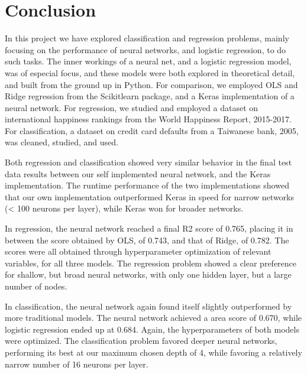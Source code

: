 \documentclass[10pt, twocolumn]{article}
\begin{document}
\section{Conclusion}
In this project we have explored classification and regression problems, mainly focusing on the performance of neural networks, and logistic regression, to do such tasks. The inner workings of a neural net, and a logistic regression model, was of especial focus, and these models were both explored in theoretical detail, and built from the ground up in Python. For comparison, we employed OLS and Ridge regression from the Scikitlearn package, and a Keras implementation of a neural network. For regression, we studied and employed a dataset on international happiness rankings from the World Happiness Report, 2015-2017. For classification, a dataset on credit card defaults from a Taiwanese bank, 2005, was cleaned, studied, and used.

Both regression and classification showed very similar behavior in the final test data results between our self implemented neural network, and the Keras implementation. The runtime performance of the two implementations showed that our own implementation outperformed Keras in speed for narrow networks (< 100 neurons per layer), while Keras won for broader networks.

In regression, the neural network reached a final R2 score of 0.765, placing it in between the score obtained by OLS, of 0.743, and that of Ridge, of 0.782. The scores were all obtained through hyperparameter optimization of relevant variables, for all three models. The regression problem showed a clear preference for shallow, but broad neural networks, with only one hidden layer, but a large number of nodes.

In classification, the neural network again found itself slightly outperformed by more traditional models. The neural network achieved a area score of 0.670, while logistic regression ended up at 0.684. Again, the hyperparameters of both models were optimized. The classification problem favored deeper neural networks, performing its best at our maximum chosen depth of 4, while favoring a relatively narrow number of 16 neurons per layer.
\end{document}
